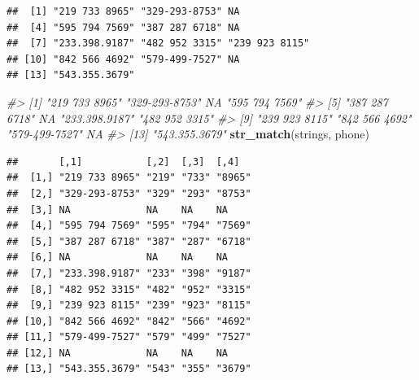 \documentclass[10pt,]{krantz}
\makeatletter
\newenvironment{Shaded}{\begin{snugshade}}{\end{snugshade}}
\newcommand{\KeywordTok}[1]{\textcolor[rgb]{0.13,0.29,0.53}{\textbf{#1}}}
\newcommand{\StringTok}[1]{\textcolor[rgb]{0.31,0.60,0.02}{#1}}
\newcommand{\CommentTok}[1]{\textcolor[rgb]{0.56,0.35,0.01}{\textit{#1}}}
\newcommand{\NormalTok}[1]{#1}
\newenvironment{kframe}{%
\medskip{}
\setlength{\fboxsep}{.8em}
 \def\at@end@of@kframe{}%
 \ifinner\ifhmode%
  \def\at@end@of@kframe{\end{minipage}}%
  \begin{minipage}{\columnwidth}%
 \fi\fi%
 \def\FrameCommand##1{\hskip\@totalleftmargin \hskip-\fboxsep
 \colorbox{shadecolor}{##1}\hskip-\fboxsep
     \hskip-\linewidth \hskip-\@totalleftmargin \hskip\columnwidth}%
 \MakeFramed {\advance\hsize-\width
   \@totalleftmargin\z@ \linewidth\hsize
   \@setminipage}}%
 {\par\unskip\endMakeFramed%
 \at@end@of@kframe}
\renewenvironment{Shaded}{\begin{kframe}}{\end{kframe}}
\makeatother
\begin{document}
\begin{verbatim}
##  [1] "219 733 8965" "329-293-8753" NA            
##  [4] "595 794 7569" "387 287 6718" NA            
##  [7] "233.398.9187" "482 952 3315" "239 923 8115"
## [10] "842 566 4692" "579-499-7527" NA            
## [13] "543.355.3679"
\end{verbatim}

\begin{Shaded}
\begin{Highlighting}[]
\CommentTok{#>  [1] "219 733 8965" "329-293-8753" NA             "595 794 7569"}
\CommentTok{#>  [5] "387 287 6718" NA             "233.398.9187" "482 952 3315"}
\CommentTok{#>  [9] "239 923 8115" "842 566 4692" "579-499-7527" NA            }
\CommentTok{#> [13] "543.355.3679"}
\KeywordTok{str_match}\NormalTok{(strings, phone)}
\end{Highlighting}
\end{Shaded}

\begin{verbatim}
##       [,1]           [,2]  [,3]  [,4]  
##  [1,] "219 733 8965" "219" "733" "8965"
##  [2,] "329-293-8753" "329" "293" "8753"
##  [3,] NA             NA    NA    NA    
##  [4,] "595 794 7569" "595" "794" "7569"
##  [5,] "387 287 6718" "387" "287" "6718"
##  [6,] NA             NA    NA    NA    
##  [7,] "233.398.9187" "233" "398" "9187"
##  [8,] "482 952 3315" "482" "952" "3315"
##  [9,] "239 923 8115" "239" "923" "8115"
## [10,] "842 566 4692" "842" "566" "4692"
## [11,] "579-499-7527" "579" "499" "7527"
## [12,] NA             NA    NA    NA    
## [13,] "543.355.3679" "543" "355" "3679"
\end{verbatim}

\begin{Shaded}
\end{Shaded}
\end{document}
